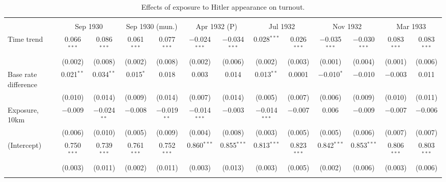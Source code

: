
\begin{table}[!htbp] \centering 
  \caption{Effects of exposure to Hitler appearance on turnout.\vspace{-.25cm}} 
  \label{tab:turnout-dd} 
\scriptsize 
\begin{tabular}{@{\extracolsep{5pt}}lcccccccccccc} 
\\[-1.8ex]\hline 
\hline \\[-1.8ex] 
 & \multicolumn{2}{c}{Sep 1930} & \multicolumn{2}{c}{Sep 1930 (mun.)} & \multicolumn{2}{c}{Apr 1932 (P)} & \multicolumn{2}{c}{Jul 1932} & \multicolumn{2}{c}{Nov 1932} & \multicolumn{2}{c}{Mar 1933} \\ 
 \cmidrule(r){2-3}\cmidrule(r){4-5}\cmidrule(r){6-7}\cmidrule(r){8-9}\cmidrule(r){10-11}\cmidrule(r){12-13}Time trend & 0.066$^{***}$ & 0.086$^{***}$ & 0.061$^{***}$ & 0.077$^{***}$ & $-$0.024$^{***}$ & $-$0.034$^{***}$ & 0.028$^{***}$ & 0.026$^{***}$ & $-$0.035$^{***}$ & $-$0.030$^{***}$ & 0.083$^{***}$ & 0.083$^{***}$ \\ 
  & (0.002) & (0.008) & (0.002) & (0.008) & (0.002) & (0.006) & (0.002) & (0.003) & (0.001) & (0.004) & (0.001) & (0.006) \\ 
  Base rate difference & 0.021$^{**}$ & 0.034$^{**}$ & 0.015$^{*}$ & 0.018 & 0.003 & 0.014 & 0.013$^{**}$ & 0.0001 & $-$0.010$^{*}$ & $-$0.010 & $-$0.003 & 0.011 \\ 
  & (0.010) & (0.014) & (0.009) & (0.014) & (0.007) & (0.014) & (0.005) & (0.007) & (0.006) & (0.009) & (0.010) & (0.011) \\ 
  Exposure, 10km & $-$0.009 & $-$0.024$^{**}$ & $-$0.008 & $-$0.019$^{**}$ & $-$0.014$^{***}$ & $-$0.003 & $-$0.014$^{***}$ & $-$0.007 & 0.006 & $-$0.009 & $-$0.007 & $-$0.006 \\ 
  & (0.006) & (0.010) & (0.005) & (0.009) & (0.004) & (0.008) & (0.003) & (0.005) & (0.005) & (0.006) & (0.007) & (0.007) \\ 
  (Intercept) & 0.750$^{***}$ & 0.739$^{***}$ & 0.761$^{***}$ & 0.752$^{***}$ & 0.860$^{***}$ & 0.855$^{***}$ & 0.813$^{***}$ & 0.823$^{***}$ & 0.842$^{***}$ & 0.853$^{***}$ & 0.806$^{***}$ & 0.803$^{***}$ \\ 
  & (0.003) & (0.011) & (0.002) & (0.011) & (0.003) & (0.013) & (0.003) & (0.005) & (0.002) & (0.006) & (0.003) & (0.006) \\ 
 \hline \\[-1.8ex] 

\end{tabular}
\end{table}
